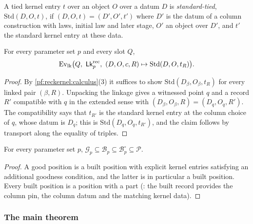 \begin{definition}\label{pf:reckernel:def-stdTie}
A tied kernel entry $t$ over an object $O$ over a datum $D$ is \emph{standard-tied}, $\mathrm{Std}(D,O,t)$, if
$(D,O,t)=(D',O',t')$ where $D'$ is the datum of a column construction with laws, initial law and later stage, $O'$
an object over $D'$, and $t'$ the standard kernel entry at these data.
\end{definition}

\begin{lemma}\label{pf:reckernel:linkStd}
For every parameter set $p$ and every slot $Q$,
\[
\reckRowE\bigl(Q,\ \reckLk^{\mathrm{rec}}_p,\ (D,O,c,R)\mapsto\mathrm{Std}(D,O,t_R)\bigr).
\]
\end{lemma}

\begin{proof}
By \cref{pf:reckernel:calculus}(3) it suffices to show $\mathrm{Std}(D_\beta,O_\beta,t_R)$ for every linked pair
$(\beta,R)$. Unpacking the linkage gives a witnessed point $q$ and a record $R'$ compatible with $q$ in the extended
sense with $(D_\beta,O_\beta,R)=(D_q,O_q,R')$. The compatibility says that $t_{R'}$ is the standard kernel entry at the
column choice of $q$, whose datum is $D_q$; this is $\mathrm{Std}(D_q,O_q,t_{R'})$, and the claim follows by transport
along the equality of triples.
\end{proof}

\begin{lemma}\label{pf:reckernel:positions}
For every parameter set $p$, $\mathcal G_p\subseteq\mathcal B_p\subseteq\mathcal B^\circ_p\subseteq\mathcal P$.
\end{lemma}

\begin{proof}
A good position is a built position with explicit kernel entries satisfying an additional goodness condition, and the
latter is in particular a built position. Every built position is a position with a part
(: the built record provides the column pin, the column datum and the
matching kernel data).
\end{proof}

\subsubsection{The main theorem}

